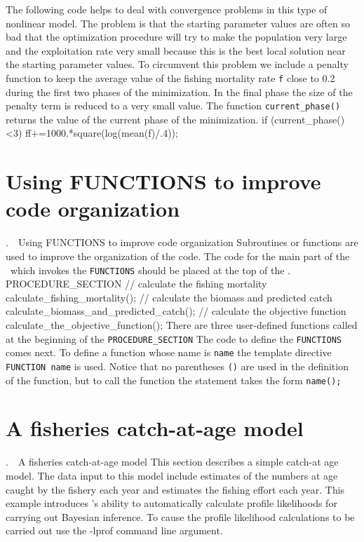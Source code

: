 \documentclass[12pt]{book}
\makeatletter
\def\mysection#1{\section{#1}{\bigbf \medbreak\noindent\number\c@chapter.\number\c@section\ \ #1\medbreak}}
\makeatother
\begin{document}
The following code helps to deal with convergence problems in this
type of nonlinear model. The problem is that the starting
parameter values are often so bad that the optimization
procedure will try to make the population very large
and the exploitation rate very small because this is
the best local solution near the starting
 parameter values. To circumvent this 
problem we include a penalty function to keep the average
value of the fishing mortality rate {\tt f} close to 0.2
during the first two phases of the minimization. 
In the final phase the size of 
the penalty term is reduced to a very small value. The function
\hbox{\tt current\_phase()} returns the value of the current phase
of the minimization. 
\beginexample
 if (current_phase()<3)
  {
    ff+=1000.*square(log(mean(f)/.4));
  }
\endexample
{}
\mysection{Using FUNCTIONS to improve code organization}
Subroutines or functions are used to improve the organization of the code. 
The code for the main part of the
\PROS\ which invokes the {\tt FUNCTIONS} should be placed at the 
top of the \PROS. 
\beginexample
PROCEDURE_SECTION
  // calculate the fishing mortality
  calculate_fishing_mortality();
  // calculate the biomass and predicted catch
  calculate_biomass_and_predicted_catch();
  // calculate the objective function
  calculate_the_objective_function();
\endexample
{}
There are three user-defined functions called at the beginning of the
{\tt PROCEDURE\_SECTION}
The code to define the {\tt FUNCTIONS} comes next.
To define a function whose name is {\tt name} the template directive 
{\tt FUNCTION name} is used. Notice that no parentheses {\tt ()} 
are used in the
definition of the function, but to call the function the 
statement takes the form \hbox{\tt name();}

\htmlnewfile
{} 
\mysection{A fisheries catch-at-age model}
This section describes a simple catch-at age model. The data input to this
model include estimates of the numbers at age caught by the fishery 
each year and  estimates the fishing effort each year. This example introduces
\ADM's ability to automatically calculate profile likelihoods
for carrying out Bayesian inference. To cause the profile likelihood calculations
to be carried out use the -lprof command line argument.
\end{document}
